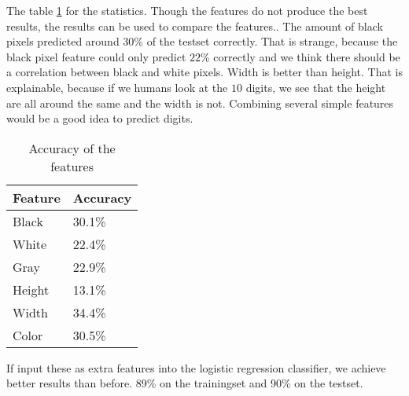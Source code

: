 \documentclass{article}
\begin{document}
The table \ref{tab:ac} for the statistics. Though the features do not produce the best results, the results can be used to compare the features.. The amount of black pixels predicted around $30$\% of the testset correctly. That is strange, because the black pixel feature could only predict $22$\%  correctly and we think there should be a correlation between black and white pixels. Width is better than height. That is explainable, because if we humans look at the $10$ digits, we see that the height are all around the same and the width is not. Combining several simple features would be a good idea to predict digits. 

\begin{table}[H]
	\begin{center}
	\begin{tabular}{l|l}
		Feature & Accuracy \\
		\hline
		Black & 30.1\% \\
		White & 22.4\% \\
		Gray & 22.9\% \\
		Height & 13.1\% \\
		Width & 34.4\% \\
		Color & 30.5\% \\
	\end{tabular}
	\end{center}	
	\label{tab:ac}
	\caption{Accuracy of the features}
\end{table}

If input these as extra features into the logistic regression classifier, we achieve better results than before. 89\% on the trainingset and 90\% on the testset.
\end{document}
